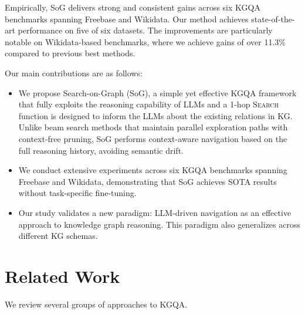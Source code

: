 \documentclass[sigconf]{acmart}
\begin{document}
Empirically, SoG delivers strong and consistent gains across six KGQA benchmarks spanning Freebase and Wikidata. Our method achieves state-of-the-art performance on five of six datasets. The improvements are particularly notable on Wikidata-based benchmarks, where we achieve gains of over 11.3\% compared to previous best methods. %

Our main contributions are as follows:
\begin{itemize}
\item We propose Search-on-Graph (SoG), a simple yet effective KGQA framework that fully exploits the reasoning capability of LLMs and %
a 1-hop \textsc{Search} function is designed to inform the LLMs about the existing relations in KG. Unlike beam search methods that maintain parallel exploration paths with context-free pruning, SoG performs context-aware navigation based on the full reasoning history, avoiding semantic drift.

\item We conduct extensive experiments across six KGQA benchmarks spanning Freebase and Wikidata, demonstrating that SoG achieves SOTA results without task-specific fine-tuning.

\item Our study validates a new paradigm: LLM-driven navigation as an effective approach to knowledge graph reasoning. This paradigm also generalizes across different KG schemas.
\end{itemize}

\section{Related Work}
\label{sec:related-work}
We review several groups of approaches to KGQA.
\end{document}
